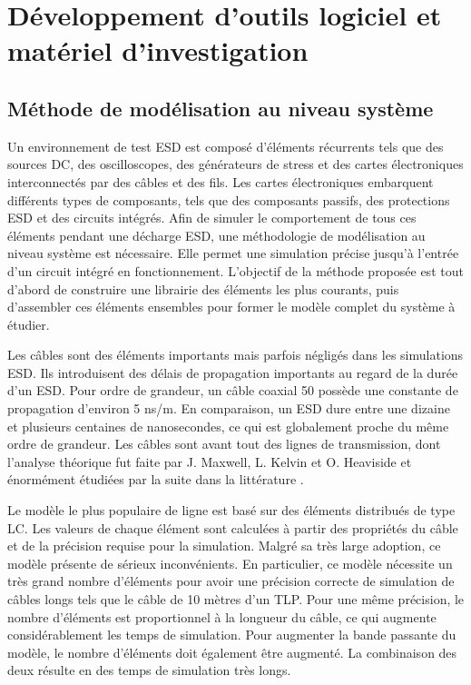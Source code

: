 \chapter{Développement d'outils logiciel et matériel d'investigation}
\label{chap:2}
\section{Méthode de modélisation au niveau système}

Un environnement de test ESD est composé d'éléments récurrents tels que des sources DC, des oscilloscopes, des générateurs de stress et des cartes électroniques interconnectés par des câbles et des fils.
Les cartes électroniques embarquent différents types de composants, tels que des composants passifs, des protections ESD et des circuits intégrés.
Afin de simuler le comportement de tous ces éléments pendant une décharge ESD, une méthodologie de modélisation au niveau système est nécessaire.
Elle permet une simulation précise jusqu'à l'entrée d'un circuit intégré en fonctionnement.
L'objectif de la méthode proposée est tout d'abord de construire une librairie des éléments les plus courants, puis d'assembler ces éléments ensembles pour former le modèle complet du système à étudier.

Les câbles sont des éléments importants mais parfois négligés dans les simulations ESD.
Ils introduisent des délais de propagation importants au regard de la durée d'un ESD.
Pour ordre de grandeur, un câble coaxial 50\textOmega{} possède une constante de propagation d'environ 5 ns/m.
En comparaison, un ESD dure entre une dizaine et plusieurs centaines de nanosecondes, ce qui est globalement proche du même ordre de grandeur.
Les câbles sont avant tout des lignes de transmission, dont l'analyse théorique fut faite par J. Maxwell, L. Kelvin et O. Heaviside et énormément étudiées par la suite dans la littérature \cite{branin-tl-ref, hf-coax,lossy-tl,emc-analysis-tl}.

Le modèle le plus populaire de ligne est basé sur des éléments distribués de type LC.
Les valeurs de chaque élément sont calculées à partir des propriétés du câble et de la précision requise pour la simulation.
Malgré sa très large adoption, ce modèle présente de sérieux inconvénients.
En particulier, ce modèle nécessite un très grand nombre d'éléments pour avoir une précision correcte de simulation de câbles longs tels que le câble de 10 mètres d'un TLP.
Pour une même précision, le nombre d'éléments est proportionnel à la longueur du câble, ce qui augmente considérablement les temps de simulation.
Pour augmenter la bande passante du modèle, le nombre d'éléments doit également être augmenté.
La combinaison des deux résulte en des temps de simulation très longs.

